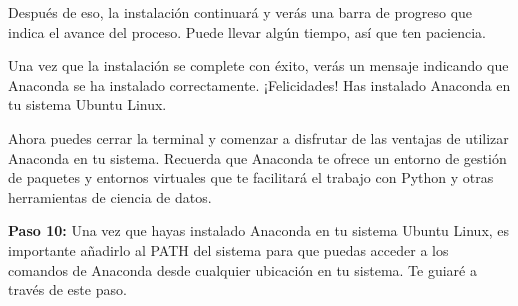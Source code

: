 \documentclass[
  a4paper,
]{article}
\begin{document}
Después de eso, la instalación continuará y verás una barra de progreso
que indica el avance del proceso. Puede llevar algún tiempo, así que ten
paciencia.

Una vez que la instalación se complete con éxito, verás un mensaje
indicando que Anaconda se ha instalado correctamente. ¡Felicidades! Has
instalado Anaconda en tu sistema Ubuntu Linux.

Ahora puedes cerrar la terminal y comenzar a disfrutar de las ventajas
de utilizar Anaconda en tu sistema. Recuerda que Anaconda te ofrece un
entorno de gestión de paquetes y entornos virtuales que te facilitará el
trabajo con Python y otras herramientas de ciencia de datos.

\textbf{Paso 10:} Una vez que hayas instalado Anaconda en tu sistema
Ubuntu Linux, es importante añadirlo al PATH del sistema para que puedas
acceder a los comandos de Anaconda desde cualquier ubicación en tu
sistema. Te guiaré a través de este paso.
\end{document}
